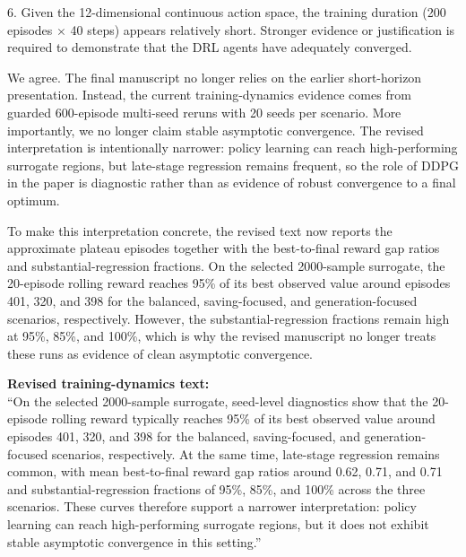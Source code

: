 \begin{ReviewerComment}
6. Given the 12-dimensional continuous action space, the training duration (200 episodes $\times$ 40 steps) appears relatively short. Stronger evidence or justification is required to demonstrate that the DRL agents have adequately converged.
\end{ReviewerComment}
%
\begin{Answer}
We agree. The final manuscript no longer relies on the earlier short-horizon presentation. Instead, the current training-dynamics evidence comes from guarded 600-episode multi-seed reruns with 20 seeds per scenario. More importantly, we no longer claim stable asymptotic convergence. The revised interpretation is intentionally narrower: policy learning can reach high-performing surrogate regions, but late-stage regression remains frequent, so the role of DDPG in the paper is diagnostic rather than as evidence of robust convergence to a final optimum.

To make this interpretation concrete, the revised text now reports the approximate plateau episodes together with the best-to-final reward gap ratios and substantial-regression fractions. On the selected 2000-sample surrogate, the 20-episode rolling reward reaches 95\% of its best observed value around episodes 401, 320, and 398 for the balanced, saving-focused, and generation-focused scenarios, respectively. However, the substantial-regression fractions remain high at 95\%, 85\%, and 100\%, which is why the revised manuscript no longer treats these runs as evidence of clean asymptotic convergence.
\end{Answer}
\begin{RevisionExcerpt}
\noindent\textbf{Revised training-dynamics text:}\\
``On the selected 2000-sample surrogate, seed-level diagnostics show that the 20-episode rolling reward typically reaches 95\% of its best observed value around episodes 401, 320, and 398 for the balanced, saving-focused, and generation-focused scenarios, respectively. At the same time, late-stage regression remains common, with mean best-to-final reward gap ratios around 0.62, 0.71, and 0.71 and substantial-regression fractions of 95\%, 85\%, and 100\% across the three scenarios. These curves therefore support a narrower interpretation: policy learning can reach high-performing surrogate regions, but it does not exhibit stable asymptotic convergence in this setting.''
\end{RevisionExcerpt}


